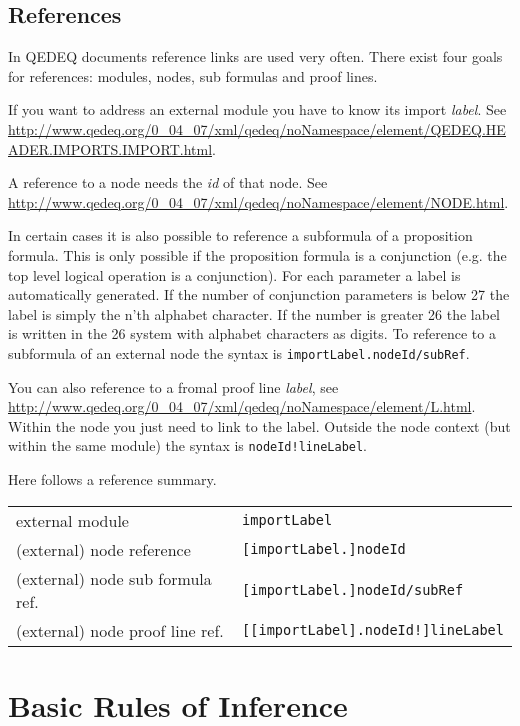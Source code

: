\documentclass[a4paper,german,10pt,twoside]{book}
\theoremstyle{definition}
\theoremstyle{remark}
\begin{document}
\section{References} \label{chapter5_section2} \hypertarget{chapter5_section2}{}
In QEDEQ documents reference links are used very often. There exist four goals for references: modules, nodes, sub formulas and proof lines. 
\par
If you want to address an external module you have to know its import \emph{label}. See \url{http://www.qedeq.org/0_04_07/xml/qedeq/noNamespace/element/QEDEQ.HEADER.IMPORTS.IMPORT.html}.
\par
A reference to a node needs the \emph{id} of that node. See \url{http://www.qedeq.org/0_04_07/xml/qedeq/noNamespace/element/NODE.html}.
\par
In certain cases it is also possible to reference a subformula of a proposition formula.
This is only possible if the proposition formula is a conjunction (e.g. the top level logical operation is a conjunction). For each parameter a label is automatically generated. If the number of conjunction parameters is below 27 the label is simply the n'th alphabet character. If the number is greater 26 the label is written in the 26 system with alphabet characters as digits. To reference to a subformula of an external node the syntax is {\tt importLabel.nodeId/subRef}.
\par
You can also reference to a fromal proof line \emph{label}, see \url{http://www.qedeq.org/0_04_07/xml/qedeq/noNamespace/element/L.html}. Within the node you just need to link to the label. Outside the node context (but within the same module) the syntax is {\tt nodeId!lineLabel}.
\par
Here follows a reference summary.
\par
\begin{tabularx}{\linewidth}{ll}
  external module                  & {\tt importLabel}                      \\
  (external) node reference        & {\tt [importLabel.]nodeId}             \\
  (external) node sub formula ref. & {\tt [importLabel.]nodeId/subRef}      \\
  (external) node proof line ref.  & {\tt [[importLabel].nodeId!]lineLabel}
\end{tabularx}



\chapter{Basic Rules of Inference} \label{chapter6} \hypertarget{chapter6}{}
\end{document}
